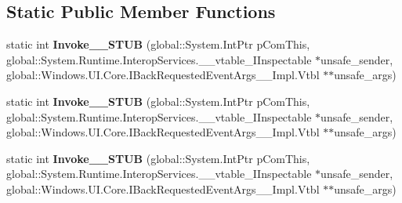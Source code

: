 \subsection*{Static Public Member Functions}
\begin{DoxyCompactItemize}
\item 
\mbox{\label{struct_system_1_1_event_handler___a___windows___u_i___core___back_requested_event_args___v_______impl_1_1_vtbl_a281486281eeecfbfee01e2f0ce1e2c70}} 
static int {\bfseries Invoke\+\_\+\+\_\+\+S\+T\+UB} (global\+::\+System.\+Int\+Ptr p\+Com\+This, global\+::\+System.\+Runtime.\+Interop\+Services.\+\_\+\+\_\+vtable\+\_\+\+I\+Inspectable $\ast$unsafe\+\_\+sender, global\+::\+Windows.\+U\+I.\+Core.\+I\+Back\+Requested\+Event\+Args\+\_\+\+\_\+\+Impl.\+Vtbl $\ast$$\ast$unsafe\+\_\+args)
\item 
\mbox{\label{struct_system_1_1_event_handler___a___windows___u_i___core___back_requested_event_args___v_______impl_1_1_vtbl_a281486281eeecfbfee01e2f0ce1e2c70}} 
static int {\bfseries Invoke\+\_\+\+\_\+\+S\+T\+UB} (global\+::\+System.\+Int\+Ptr p\+Com\+This, global\+::\+System.\+Runtime.\+Interop\+Services.\+\_\+\+\_\+vtable\+\_\+\+I\+Inspectable $\ast$unsafe\+\_\+sender, global\+::\+Windows.\+U\+I.\+Core.\+I\+Back\+Requested\+Event\+Args\+\_\+\+\_\+\+Impl.\+Vtbl $\ast$$\ast$unsafe\+\_\+args)
\item 
\mbox{\label{struct_system_1_1_event_handler___a___windows___u_i___core___back_requested_event_args___v_______impl_1_1_vtbl_a281486281eeecfbfee01e2f0ce1e2c70}} 
static int {\bfseries Invoke\+\_\+\+\_\+\+S\+T\+UB} (global\+::\+System.\+Int\+Ptr p\+Com\+This, global\+::\+System.\+Runtime.\+Interop\+Services.\+\_\+\+\_\+vtable\+\_\+\+I\+Inspectable $\ast$unsafe\+\_\+sender, global\+::\+Windows.\+U\+I.\+Core.\+I\+Back\+Requested\+Event\+Args\+\_\+\+\_\+\+Impl.\+Vtbl $\ast$$\ast$unsafe\+\_\+args)
\item 
\mbox{\label{struct_system_1_1_event_handler___a___windows___u_i___core___back_requested_event_args___v_______impl_1_1_vtbl_a281486281eeecfbfee01e2f0ce1e2c70}} 
$$
\end{DoxyCompactItemize}
